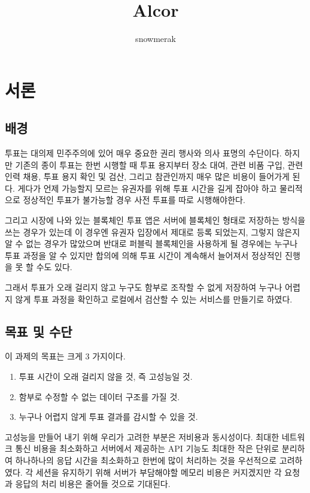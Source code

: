 \documentclass[10pt,a4paper,left=15mm,right=15mm,top=20mm,bottom=20mm]{article}
\title{Alcor}
\author{snowmerak}
\begin{document}
\maketitle

\tableofcontents
\listoffigures

\newpage
\section{서론}

\subsection{배경}

투표는 대의제 민주주의에 있어 매우 중요한 권리 행사와 의사 표명의 수단이다. 하지만 기존의 종이 투표는 한번 시행할 때 투표 용지부터 장소 대여, 관련 비품 구입, 관련 인력 채용, 투표 용지 확인 및 검산, 그리고 참관인까지 매우 많은 비용이 들어가게 된다. 게다가 언제 가능할지 모르는 유권자를 위해 투표 시간을 길게 잡아야 하고 물리적으로 정상적인 투표가 불가능할 경우 사전 투표를 따로 시행해야한다.

그리고 시장에 나와 있는 블록체인 투표 앱은 서버에 블록체인 형태로 저장하는 방식을 쓰는 경우가 있는데 이 경우엔 유권자 입장에서 제대로 등록 되었는지, 그렇지 않은지 알 수 없는 경우가 많았으며 반대로 퍼블릭 블록체인을 사용하게 될 경우에는 누구나 투표 과정을 알 수 있지만 합의에 의해 투표 시간이 계속해서 늘어져서 정상적인 진행을 못 할 수도 있다.

그래서 투표가 오래 걸리지 않고 누구도 함부로 조작할 수 없게 저장하여 누구나 어렵지 않게 투표 과정을 확인하고 로컬에서 검산할 수 있는 서비스를 만들기로 하였다.

\subsection{목표 및 수단}

이 과제의 목표는 크게 3 가지이다.
\begin{enumerate}
 \item 투표 시간이 오래 걸리지 않을 것, 즉 고성능일 것.
 \item 함부로 수정할 수 없는 데이터 구조를 가질 것.
 \item 누구나 어렵지 않게 투표 결과를 감시할 수 있을 것.
\end{enumerate}

고성능을 만들어 내기 위해 우리가 고려한 부분은 저비용과 동시성이다. 최대한 네트워크 통신 비용을 최소화하고 서버에서 제공하는 API 기능도 최대한 작은 단위로 분리하여 하나하나의 응답 시간을 최소화하고 한번에 많이 처리하는 것을 우선적으로 고려하였다. 각 세션을 유지하기 위해 서버가 부담해야할 메모리 비용은 커지겠지만 각 요청과 응답의 처리 비용은 줄어들 것으로 기대된다.
\end{document}
